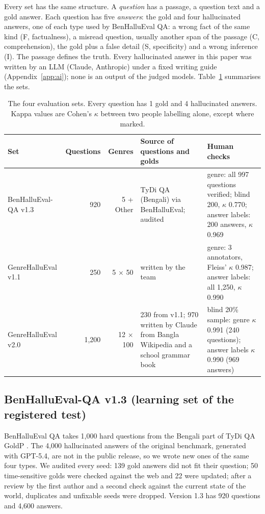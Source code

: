 \documentclass[11pt]{article}
\begin{document}
Every set has the same structure. A \emph{question} has a passage, a question text and a gold answer. Each question
has five \emph{answers}: the gold and four hallucinated answers, one of each type used by BenHalluEval QA: a wrong fact
of the same kind (F, factualness), a misread question, usually another span of the passage (C, comprehension), the
gold plus a false detail (S, specificity) and a wrong inference (I). The passage defines the truth. Every hallucinated
answer in this paper was written by an LLM (Claude, Anthropic) under a fixed writing guide (Appendix~\ref{app:ai});
none is an output of the judged models. Table~\ref{tab:data} summarises the sets.

\begin{table}[t]
\centering\small
\caption{The four evaluation sets. Every question has 1 gold and 4 hallucinated answers. Kappa values are Cohen's
$\kappa$ between two people labelling alone, except where marked.}\label{tab:data}
\begin{tabularx}{\textwidth}{@{}l r r X X@{}}
\toprule
Set & Questions & Genres & Source of questions and golds & Human checks \\
\midrule
BenHalluEval-QA v1.3 & 920 & 5 + Other & TyDi QA (Bengali) via BenHalluEval; audited & genre: all 997 questions verified; blind 200, $\kappa$ 0.770; answer labels: 200 answers, $\kappa$ 0.969 \\
GenreHalluEval v1.1 & 250 & 5 $\times$ 50 & written by the team & genre: 3 annotators, Fleiss' $\kappa$ 0.987; answer labels: all 1,250, $\kappa$ 0.990 \\
GenreHalluEval v2.0 & 1,200 & 12 $\times$ 100 & 230 from v1.1; 970 written by Claude from Bangla Wikipedia and a school grammar book & blind 20\% sample: genre $\kappa$ 0.991 (240 questions); answer labels $\kappa$ 0.990 (969 answers) \\
\bottomrule
\end{tabularx}
\end{table}

\subsection{BenHalluEval-QA v1.3 (learning set of the registered test)}

BenHalluEval QA takes 1,000 hard questions from the Bengali part of TyDi QA GoldP \citep{benhallueval,clark2020tydi}.
The 4,000 hallucinated answers of the original benchmark, generated with GPT-5.4, are not in the public release, so we
wrote new ones of the same four types. We audited every seed: 139 gold answers did not fit their question; 50
time-sensitive golds were checked against the web and 22 were updated; after a review by the first author and a
second check against the current state of the world, duplicates and unfixable seeds were dropped. Version 1.3 has 920
questions and 4,600 answers.
\end{document}
